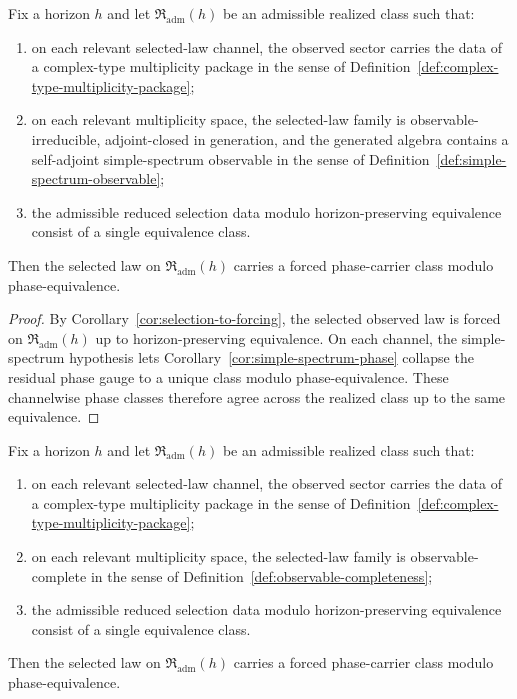 \begin{corollary}
\label{cor:realized-phase-from-simple-spectrum}
Fix a horizon $h$ and let $\mathfrak R_{\mathrm{adm}}(h)$ be an admissible
realized class such that:
\begin{enumerate}[label=(\roman*), leftmargin=2em, itemsep=0.2em]
\item on each relevant selected-law channel, the observed sector carries the
      data of a complex-type multiplicity package in the sense of
      Definition~\ref{def:complex-type-multiplicity-package};
\item on each relevant multiplicity space, the selected-law family is
      observable-irreducible, adjoint-closed in generation, and the generated
      algebra contains a self-adjoint simple-spectrum observable in the sense
      of Definition~\ref{def:simple-spectrum-observable};
\item the admissible reduced selection data modulo horizon-preserving
      equivalence consist of a single equivalence class.
\end{enumerate}
Then the selected law on $\mathfrak R_{\mathrm{adm}}(h)$ carries a forced
phase-carrier class modulo phase-equivalence.
\end{corollary}

\begin{proof}
By Corollary~\ref{cor:selection-to-forcing}, the selected observed law is
forced on $\mathfrak R_{\mathrm{adm}}(h)$ up to horizon-preserving
equivalence. On each channel, the simple-spectrum hypothesis lets
Corollary~\ref{cor:simple-spectrum-phase} collapse the residual phase gauge to
a unique class modulo phase-equivalence. These channelwise phase classes
therefore agree across the realized class up to the same equivalence.
\end{proof}

\begin{corollary}
\label{cor:realized-phase-from-observable-completeness}
Fix a horizon $h$ and let $\mathfrak R_{\mathrm{adm}}(h)$ be an admissible
realized class such that:
\begin{enumerate}[label=(\roman*), leftmargin=2em, itemsep=0.2em]
\item on each relevant selected-law channel, the observed sector carries the
      data of a complex-type multiplicity package in the sense of
      Definition~\ref{def:complex-type-multiplicity-package};
\item on each relevant multiplicity space, the selected-law family is
      observable-complete in the sense of
      Definition~\ref{def:observable-completeness};
\item the admissible reduced selection data modulo horizon-preserving
      equivalence consist of a single equivalence class.
\end{enumerate}
Then the selected law on $\mathfrak R_{\mathrm{adm}}(h)$ carries a forced
phase-carrier class modulo phase-equivalence.
\end{corollary}

